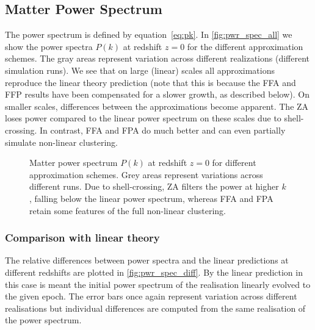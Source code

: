 \subsection{Matter Power Spectrum}
\label{sec:pwr_spec}
The power spectrum is defined by equation~\eqref{eq:pk}. In \autoref{fig:pwr_spec_all} we show the power spectra $P(k)$ at redshift $z=0$ for the different approximation schemes. The gray areas represent variation across different realizations (different simulation runs). We see that on large (linear) scales all approximations reproduce the linear theory prediction (note that this is because the FFA and FFP results have been compensated for a slower growth, as described below). On smaller scales, differences between the approximations become apparent. The ZA loses power compared to the linear power spectrum on these scales due to shell-crossing. In contrast, FFA and FPA do much better and can even partially simulate non-linear clustering.

\begin{figure}
\centering
	\begin{subfigure}{\textwidth}
	\end{subfigure}
	\begin{subfigure}{\textwidth}
	\end{subfigure}%
    \caption{Matter power spectrum $P(k)$ at redshift $z=0$ for different approximation schemes. Grey areas represent variations across different runs. Due to shell-crossing, ZA filters the power at higher $k$, falling below the linear power spectrum, whereas FFA and FPA retain some features of the full non-linear clustering.}
    \label{fig:pwr_spec_all}
\end{figure}

\subsubsection{Comparison with linear theory}
The relative differences between power spectra and the linear predictions at different redshifts are plotted in \autoref{fig:pwr_spec_diff}. By the linear prediction in this case is meant the initial power spectrum of the realisation linearly evolved to the given epoch. The error bars once again represent variation across different realisations but individual differences are computed from the same realisation of the power spectrum.

